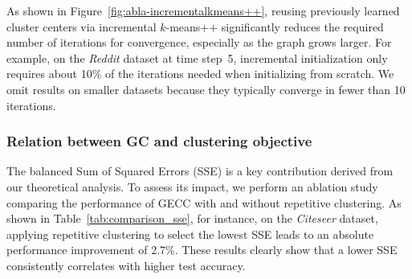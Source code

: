 As shown in Figure~\ref{fig:abla-incrementalkmeans++}, reusing previously learned cluster centers via incremental \(k\)-means++ significantly reduces the required number of iterations for convergence, especially as the graph grows larger. For example, on the \textit{Reddit} dataset at time step~5, incremental initialization only requires about 10\% of the iterations needed when initializing from scratch. We omit results on smaller datasets because they typically converge in fewer than 10 iterations.



\subsubsection{Relation between GC and clustering objective}
The balanced Sum of Squared Errors (SSE) is a key contribution derived from our theoretical analysis. To assess its impact, we perform an ablation study comparing the performance of GECC with and without repetitive clustering. As shown in Table~\ref{tab:comparison_sse}, for instance, on the \textit{Citeseer} dataset, applying repetitive clustering to select the lowest SSE leads to an absolute performance improvement of 2.7\%. These results clearly show that a lower SSE consistently correlates with higher test accuracy.
